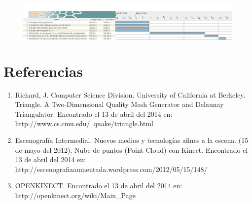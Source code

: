 \documentclass[letterpaper]{article}
\begin{document}
\begin{figure}[ht]
\includegraphics[width=1\linewidth]{10288526_791857134159417_2036565498_o.jpg}
\end{figure}

\section{Referencias}

\begin{enumerate}

\item Richard, J. Computer Science Division. University of California at Berkeley. Triangle. A Two-Dimensional Quality Mesh Generator and 
Delaunay Triangulator. Encontrado el 13 de abril del 2014 en: http://www.cs.cmu.edu/~quake/triangle.html
\item Escenografía Intermedial. Nuevos medios y tecnologías afines a la escena. (15 de mayo del 2012).
Nube de puntos (Point Cloud) con Kinect. Encontrado el 13 de abril del 2014 en: http://escenografiaaumentada.wordpress.com/2012/05/15/148/
\item OPENKINECT. Encontrado el 13 de abril del 2014 en: http://openkinect.org/wiki/Main\_Page

\end{enumerate}

	
\end{document}
